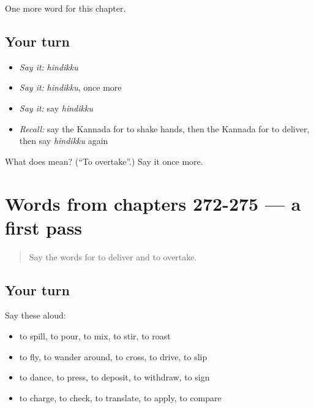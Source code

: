 \begin{grammarlens}[title={What you've built}]
One more word for this chapter.
\end{grammarlens}

\subsection*{Your turn}
\begin{itemize}
\raggedright
  \item \emph{Say it:} \emph{hindikku}
  \item \emph{Say it:} \emph{hindikku}, once more
  \item \emph{Say it:} say \emph{hindikku}
  \item \emph{Recall:} say the Kannada for to shake hands, then the Kannada for to deliver, then say \emph{hindikku} again
\end{itemize}

\begin{tcolorbox}[breakable,colback=teal!4,colframe=teal!35!black,title={Before you move on}]
What does  mean? (\textquotedblleft{}To overtake\textquotedblright{}.) Say it once more.
\end{tcolorbox}
\section[(dialogue)]{Words from chapters 272-275 — a first pass}

\label{lesson:KA-R280-first-pass-words-from-chapters-272-275}



\begin{quote}
Say the words for to deliver and to overtake.
\end{quote}

\subsection*{Your turn}
Say these aloud:

\begin{itemize}
\raggedright
  \item to spill, to pour, to mix, to stir, to roast
  \item to fly, to wander around, to cross, to drive, to slip
  \item to dance, to press, to deposit, to withdraw, to sign
  \item to charge, to check, to translate, to apply, to compare
\end{itemize}


